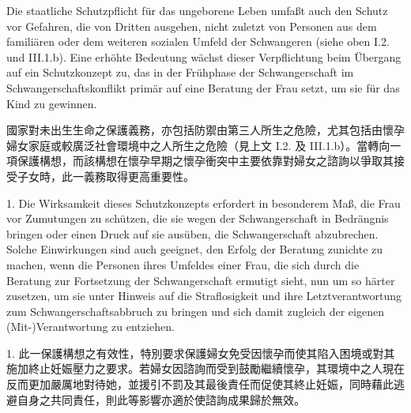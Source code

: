 \documentclass[12pt]{article}
\begin{document}

\begin{sourcepara}[title={原文D.151}]
Die staatliche Schutzpflicht für das ungeborene Leben umfaßt auch den Schutz vor Gefahren, die von Dritten ausgehen, nicht zuletzt von Personen aus dem familiären oder dem weiteren sozialen Umfeld der Schwangeren (siehe oben I.2. und III.1.b). Eine erhöhte Bedeutung wächst dieser Verpflichtung beim Übergang auf ein Schutzkonzept zu, das in der Frühphase der Schwangerschaft im Schwangerschaftskonflikt primär auf eine Beratung der Frau setzt, um sie für das Kind zu gewinnen.
\end{sourcepara}
\begin{transpara}
國家對未出生生命之保護義務，亦包括防禦由第三人所生之危險，尤其包括由懷孕婦女家庭或較廣泛社會環境中之人所生之危險（見上文 I.2. 及 III.1.b）。當轉向一項保護構想，而該構想在懷孕早期之懷孕衝突中主要依靠對婦女之諮詢以爭取其接受子女時，此一義務取得更高重要性。
\end{transpara}

\begin{sourcepara}[title={原文D.152}]
1. Die Wirksamkeit dieses Schutzkonzepts erfordert in besonderem Maß, die Frau vor Zumutungen zu schützen, die sie wegen der Schwangerschaft in Bedrängnis bringen oder einen Druck auf sie ausüben, die Schwangerschaft abzubrechen. Solche Einwirkungen sind auch geeignet, den Erfolg der Beratung zunichte zu machen, wenn die Personen ihres Umfeldes einer Frau, die sich durch die Beratung zur Fortsetzung der Schwangerschaft ermutigt sieht, nun um so härter zusetzen, um sie unter Hinweis auf die Straflosigkeit und ihre Letztverantwortung zum Schwangerschaftsabbruch zu bringen und sich damit zugleich der eigenen (Mit-)Verantwortung zu entziehen.
\end{sourcepara}
\begin{transpara}
1. 此一保護構想之有效性，特別要求保護婦女免受因懷孕而使其陷入困境或對其施加終止妊娠壓力之要求。若婦女因諮詢而受到鼓勵繼續懷孕，其環境中之人現在反而更加嚴厲地對待她，並援引不罰及其最後責任而促使其終止妊娠，同時藉此逃避自身之共同責任，則此等影響亦適於使諮詢成果歸於無效。
\end{transpara}
\end{document}
